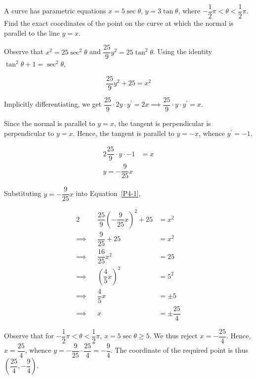 \documentclass{echw}
\begin{document}

    \problem{}
        A curve has parametric equations $x = 5\sec\theta, \, y = 3\tan\theta$, where $-\dfrac12\pi < \theta < \dfrac12\pi$. Find the exact coordinates of the point on the curve at which the normal is parallel to the line $y=x$.

    \solution
        Observe that $x^2 = 25\sec^2\theta$ and $\dfrac{25}9 y^2 = 25\tan^2\theta$. Using the identity $\tan^2\theta + 1 = \sec^2\theta$,

        \begin{equation}\label{P4-1}
            \dfrac{25}9 y^2 + 25 = x^2
        \end{equation}

        Implicitly differentiating, we get $\dfrac{25}9 \cdot 2y \cdot y^\prime = 2x \implies \dfrac{25}9 \cdot y \cdot y^\prime = x$.

        Since the normal is parallel to $y =x$, the tangent is perpendicular is perpendicular to $y=x$. Hence, the tangent is parallel to $y = -x$, whence $y^\prime = -1$.

        \begin{alignat*}{2}
            \dfrac{25}9 \cdot y \cdot -1 &= x\\
            y = -\dfrac{9}{25} x
        \end{alignat*}

        Substituting $y = -\dfrac9{25}x$ into Equation~\ref{P4-1},

        \begin{alignat*}{2}
            &&\dfrac{25}9 \left(-\dfrac9{25}x\right)^2+25 &= x^2\\
            \implies&&\dfrac{9}{25} + 25 &= x^2\\
            \implies&&\dfrac{16}{25}x^2 &= 25\\
            \implies&&\left(\dfrac45 x\right)^2 &= 5^2\\
            \implies&&\dfrac45 x &= \pm 5\\
            \implies&& x &= \pm \dfrac{25}4
        \end{alignat*}

        Observe that for $-\dfrac12\pi < \theta < \dfrac12\pi$, $x=5\sec\theta \geq 5$. We thus reject $x = -\dfrac{25}4$. Hence, $x=\dfrac{25}4$, whence $y = -\dfrac{9}{25} \cdot \dfrac{25}4 = -\dfrac{9}4$. The coordinate of the required point is thus $\left(\dfrac{25}4, -\dfrac94\right)$.
        
\end{document}
